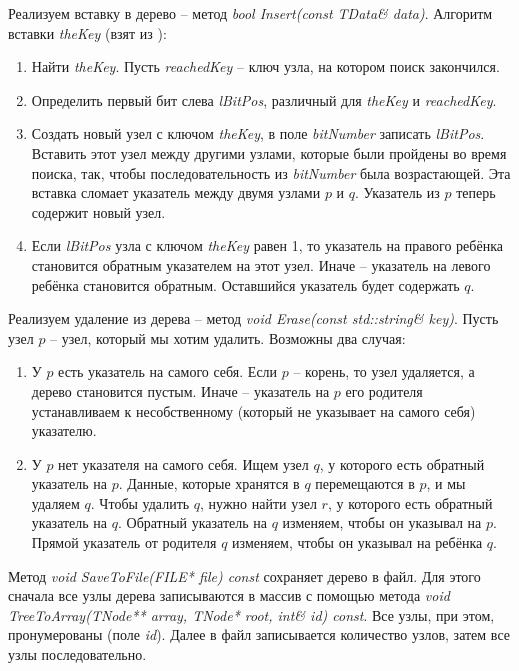 Реализуем вставку в дерево -- метод \textit{bool Insert(const TData\& data)}. Алгоритм вставки
\textit{theKey} (взят из \cite{Mehta}):
\begin{enumerate}
	\item Найти \textit{theKey}. Пусть \textit{reachedKey} -- ключ узла, на котором поиск закончился.
	\item Определить первый бит слева \textit{lBitPos}, различный для \textit{theKey} и \textit{reachedKey}.
	\item Создать новый узел с ключом \textit{theKey}, в поле \textit{bitNumber} записать \textit{lBitPos}.
	Вставить этот узел между другими узлами, которые были пройдены во время поиска, так, чтобы последовательность 
	из \textit{bitNumber} была возрастающей. Эта вставка сломает указатель между двумя узлами $p$ и $q$.
	Указатель из $p$ теперь содержит новый узел.
	\item Если \textit{lBitPos} узла с ключом \textit{theKey} равен 1, то указатель на правого ребёнка становится 
	обратным указателем на этот узел. Иначе -- указатель на левого ребёнка становится обратным. Оставшийся
	указатель будет содержать $q$.
\end{enumerate}

Реализуем удаление из дерева -- метод \textit{void Erase(const std::string\& key)}. Пусть узел $p$ -- узел, который
мы хотим удалить. Возможны два случая:
\begin{enumerate}
	\item У $p$ есть указатель на самого себя. Если $p$ -- корень, то узел удаляется, а дерево становится пустым.
	Иначе -- указатель на $p$ его родителя устанавливаем к несобственному (который не указывает на самого себя) указателю.
	\item У $p$ нет указателя на самого себя. Ищем узел $q$, у которого есть обратный указатель на $p$. Данные, которые 
	хранятся в $q$ перемещаются в $p$, и мы удаляем $q$. Чтобы удалить $q$, нужно найти узел $r$, у которого есть
	обратный указатель на $q$. Обратный указатель на $q$ изменяем, чтобы он указывал на $p$. Прямой указатель от родителя
	$q$ изменяем, чтобы он указывал на ребёнка $q$.
\end{enumerate}

Метод \textit{void SaveToFile(FILE* file) const} сохраняет дерево в файл. Для этого сначала все узлы дерева записываются
в массив с помощью метода \textit{void TreeToArray(TNode** array, TNode* root, int\& id) const}. Все узлы, при этом, пронумерованы (поле \textit{id}).
Далее в файл записывается количество узлов, затем все узлы последовательно.

